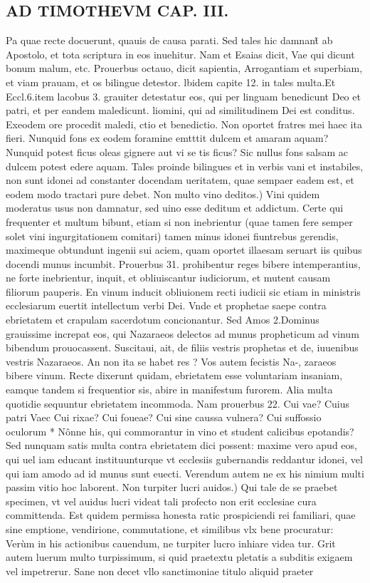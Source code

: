\documentclass{article}
\begin{document}
\begin{pages}
\section*{AD TIMOTHEVM CAP. III. }
\marginpar{[ p.83 ]}\pstart Pa quae recte docuerunt, quauis de causa parati. Sed tales hic damnant̃ ab Apostolo, et tota scriptura in eos inuehitur. Nam et Esaias dicit, Vae qui dicunt bonum malum, etc. Prouerbus octauo, dicit sapientia, Arrogantiam et superbiam, et viam prauam, et os bilingue detestor. lbidem capite 12. in tales multa.Et Eccl.6.item lacobus 3. grauiter detestatur eos, qui per linguam benedicunt Deo et patri, et per eandem maledicunt. liomini, qui ad similitudinem Dei est conditus. Exeodem ore procedit maledi, ctio et benedictio. Non oportet fratres mei haec ita fieri. Nunquid fons ex eodem foramine emtttit dulcem et amaram aquam? Nunquid potest ficus oleas gignere aut vi se tis ficus? Sic nullus fons salsam ac dulcem potest edere aquam. Tales proinde bilingues et in verbis vani et instabiles, non sunt idonei ad constanter docendam ueritatem, quae sempaer eadem est, et eodem modo tractari pure debet.  \pend\pstart Non multo vino deditos.) Vini quidem moderatus usus non damnatur, sed uino esse deditum et addictum. Certe qui frequenter et multum bibunt, etiam si non inebrientur (quae tamen fere semper solet vini ingurgitationem comitari) tamen minus idonei fiuntrebus gerendis, maximeque obtundunt ingenii sui aciem, quam oportet illaesam seruart iis quibus docendi munus incumbit. Prouerbus 31. prohibentur reges bibere intemperantius, ne forte inebrientur, inquit, et obliuiscantur iudiciorum, et mutent causam filiorum pauperis. En vinum inducit obliuionem recti iudicii sic etiam in ministris ecclesiarum euertit intellectum verbi Dei. Vnde et prophetae saepe contra ebrietatem et crapulam sacerdotum concionantur. Sed Amos 2.Dominus grauissime increpat eos, qui Nazaraeos delectos ad munus propheticum ad vinum bibendum prouocassent. Suscitaui, ait, de filiis vestris prophetas et de, iuuenibus vestris Nazaraeos. An non ita se habet res ? Vos autem fecistis Na-, zaraeos bibere vinum. Recte dixerunt quidam, ebrietatem esse voluntariam insaniam, eamque tandem si frequentior sis, abire in manifestum furorem. Alia multa quotidie sequuntur ebrietatem incommoda. Nam prouerbus 22. Cui vae? Cuius patri Vaec Cui rixae? Cui foueae? Cui sine caussa vulnera? Cui suffossio oculorum * Nônne his, qui commorantur in vino et student calicibus epotandis? Sed nunquam satis multa contra ebrietatem dici possent: maxime vero apud eos, qui uel iam educant instituunturque vt ecclesiis gubernandis reddantur idonei, vel qui iam amodo ad id munus sunt euecti. Verendum autem ne ex his nimium multi passim vitio hoc laborent.  \pend\pstart Non turpiter lucri auidos.) Qui tale de se praebet specimen, vt vel auidus lucri videat tali profecto non erit ecclesiae cura committenda. Est quidem permissa honesta ratic prospiciendi rei familiari, quae sine emptione, vendirione, commutatione, et similibus vlx bene procuratur: Verùm in his actionibus cauendum, ne turpiter lucro inhiare videa tur. Grit autem luerum multo turpissimum, si quid praetextu pletatis a subditis exigaem vel impetrerur. Sane non decet vllo sanctimoniae titulo aliquid praeter 
\end{pages}
\end{document}
